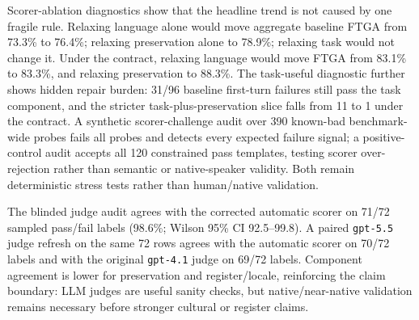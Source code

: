 Scorer-ablation diagnostics show that the headline trend is not caused by one
fragile rule. Relaxing language alone would move aggregate baseline FTGA from
73.3\% to 76.4\%; relaxing preservation alone to 78.9\%; relaxing task would not
change it. Under the contract, relaxing language would move FTGA from 83.1\% to
83.3\%, and relaxing preservation to 88.3\%. The task-useful diagnostic further
shows hidden repair burden: 31/96 baseline first-turn failures still pass the
task component, and the stricter task-plus-preservation slice falls from 11 to
1 under the contract. A synthetic scorer-challenge audit over 390 known-bad
benchmark-wide probes fails all probes and detects every expected failure
signal; a positive-control audit accepts all 120 constrained pass templates,
testing scorer over-rejection rather than semantic or native-speaker validity.
Both remain deterministic stress tests rather than human/native validation.

The blinded judge audit agrees with the corrected automatic scorer on 71/72
sampled pass/fail labels (98.6\%; Wilson 95\% CI 92.5--99.8). A paired
\texttt{gpt-5.5} judge refresh on the same 72 rows agrees with the automatic
scorer on 70/72 labels and with the original \texttt{gpt-4.1} judge on 69/72
labels. Component agreement is lower for preservation and register/locale,
reinforcing the claim boundary: LLM judges are useful sanity checks, but
native/near-native validation remains necessary before stronger cultural or
register claims.
